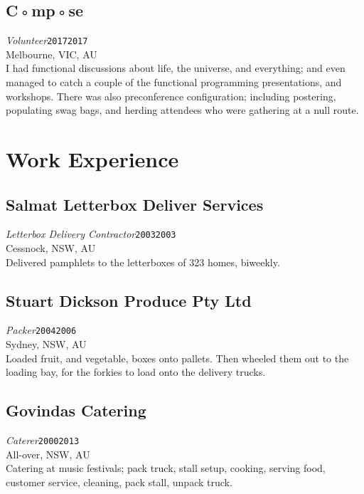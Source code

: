 \documentclass[12pt,a4paper,oneside]{article}
\newcommand{\xp}[6]{{\normalsize\textit{#1}\hfill\texttt{#5}\\\phantom{menace}\hfill#2, #3, #4}\\}
\newcommand{\textapprox}{\raisebox{0.5ex}{\texttildelow}}
\begin{document}
\subsection{C◦mp◦se}
\xp{Volunteer}{Melbourne}{VIC}{AU}{2017\textapprox{}2017}
\\I had functional discussions about life, the universe, and everything; and even managed to catch a couple of the functional programming presentations, and workshops. There was also preconference configuration; including postering, populating swag bags, and herding attendees who were gathering at a null route.

\section{Work Experience}
\subsection{Salmat Letterbox Deliver Services}
\xp{Letterbox Delivery Contractor}{Cessnock}{NSW}{AU}{2003\textapprox{}2003}
\\Delivered pamphlets to the letterboxes of 323 homes, biweekly.
\subsection{Stuart Dickson Produce Pty Ltd}
\xp{Packer}{Sydney}{NSW}{AU}{2004\textapprox{}2006}
\\Loaded fruit, and vegetable, boxes onto pallets. Then wheeled them out to the loading bay, for the forkies to load onto the delivery trucks.
\subsection{Govindas Catering}
\xp{Caterer}{All-over}{NSW}{AU}{2000\textapprox{}2013}
\\Catering at music festivals; pack truck, stall setup, cooking, serving food, customer service, cleaning, pack stall, unpack truck.

\end{document}
